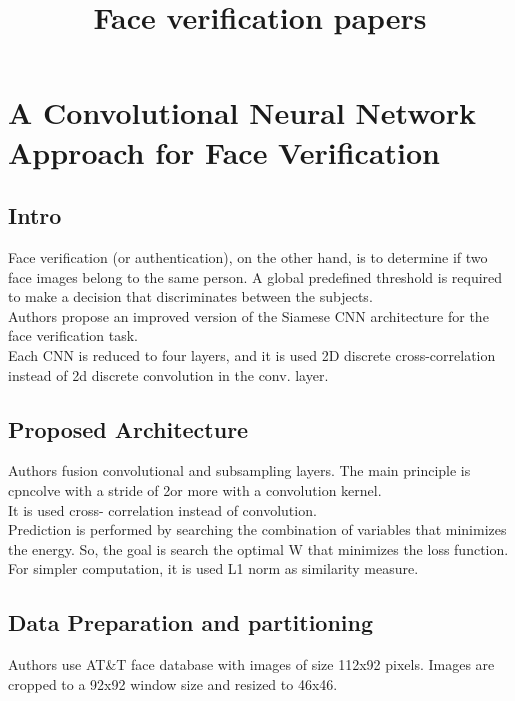 \documentclass[a4paper]{article}
\begin{document}
\title{Face verification papers}
\maketitle

\section{A Convolutional Neural Network Approach for Face Verification}

\subsection{Intro}
Face verification (or authentication), on the other hand, is to determine if two face images belong to the same person. A global predefined threshold is required to make a decision that discriminates between the subjects.\\

Authors propose an improved version of the Siamese CNN architecture for the face verification task.\\

Each CNN is reduced to four layers, and it is used 2D discrete cross-correlation instead of 2d discrete convolution in the conv. layer.\\ 

\subsection{Proposed Architecture}
Authors fusion convolutional and subsampling layers. The main principle is cpncolve with a stride of 2or more with a convolution kernel. \\

It is used cross- correlation instead of convolution.\\

Prediction is performed by searching the combination of variables that minimizes the energy. So, the goal is search the optimal W that minimizes the loss function. For simpler computation, it is used L1 norm as similarity measure.\\

\subsection{Data Preparation and partitioning}
Authors use AT\&T face database with images of size 112x92 pixels. Images are cropped to a 92x92 window size and resized to 46x46.\\
\end{document}
